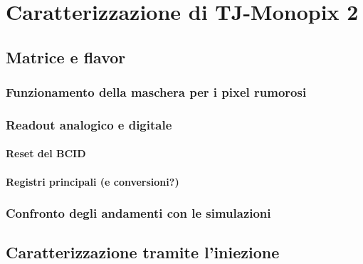 \documentclass[10pt,a4paper,twoside]{report}
\begin{document}

\chapter{Caratterizzazione di TJ-Monopix 2}

\section{Matrice e flavor}

\subsection{Funzionamento della maschera per i pixel rumorosi}

\subsection{Readout analogico e digitale}

\subsubsection{Reset del BCID}
\begin{comment}
REFERENZE
\end{comment}

\subsubsection{Registri principali (e conversioni?)}

\subsection{Confronto degli andamenti con le simulazioni}


\section{Caratterizzazione tramite l'iniezione}
\end{document}
